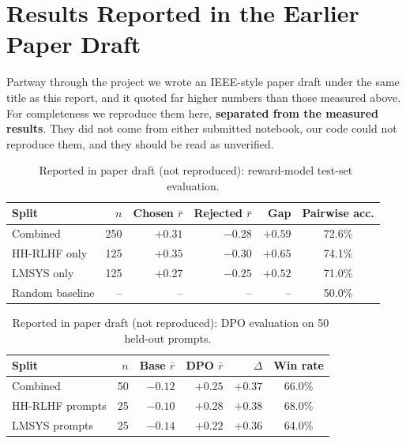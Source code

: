 \section{Results Reported in the Earlier Paper Draft}
\label{sec:reported}

Partway through the project we wrote an IEEE-style paper draft under the same title as this report, and it quoted far higher numbers than those measured above. For completeness we reproduce them here, \textbf{separated from the measured results}. They did not come from either submitted notebook, our code could not reproduce them, and they should be read as unverified.

\begin{table}[!htbp]
\centering
\caption[Paper draft (not reproduced): reward-model results]{\reportedtag\ Reported in paper draft (not reproduced): reward-model test-set evaluation.}
\label{tab:rep-rm}
\small
\begin{tabular}{@{}lrrrrc@{}}
\toprule
\textbf{Split} & \textbf{$n$} & \textbf{Chosen $\bar r$} & \textbf{Rejected $\bar r$} & \textbf{Gap} & \textbf{Pairwise acc.}\\
\midrule
Combined & 250 & $+0.31$ & $-0.28$ & $+0.59$ & 72.6\%\\
HH-RLHF only & 125 & $+0.35$ & $-0.30$ & $+0.65$ & 74.1\%\\
LMSYS only & 125 & $+0.27$ & $-0.25$ & $+0.52$ & 71.0\%\\
Random baseline & -- & -- & -- & -- & 50.0\%\\
\bottomrule
\end{tabular}
\end{table}

\begin{table}[!htbp]
\centering
\caption[Paper draft (not reproduced): DPO win rates]{\reportedtag\ Reported in paper draft (not reproduced): DPO evaluation on 50 held-out prompts.}
\label{tab:rep-dpo}
\small
\begin{tabular}{@{}lrrrrc@{}}
\toprule
\textbf{Split} & \textbf{$n$} & \textbf{Base $\bar r$} & \textbf{DPO $\bar r$} & \textbf{$\Delta$} & \textbf{Win rate}\\
\midrule
Combined & 50 & $-0.12$ & $+0.25$ & $+0.37$ & 66.0\%\\
HH-RLHF prompts & 25 & $-0.10$ & $+0.28$ & $+0.38$ & 68.0\%\\
LMSYS prompts & 25 & $-0.14$ & $+0.22$ & $+0.36$ & 64.0\%\\
\bottomrule
\end{tabular}
\end{table}

